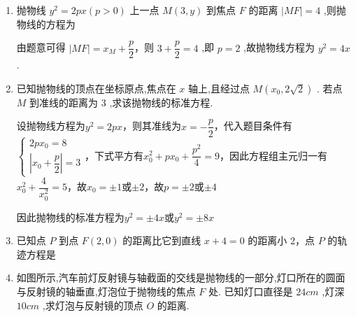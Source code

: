 \begin{enumerate}
\begin{enumerate}
\begin{jieda}
        \end{jieda}
        \item 抛物线 ${y}^{2} = {2px}\left( {p > 0}\right)$ 上一点 $M\left( {3,y}\right)$ 到焦点 $F$ 的距离 $\left| {MF}\right|  = 4$ ,则抛物线的方程为
        \begin{jieda}
            由题意可得 $\left| {MF}\right|  = {x}_{M} + \dfrac{p}{2}$，则 $3 + \dfrac{p}{2} = 4$ ,即 $p = 2$ ,故抛物线方程为 ${y}^{2} = {4x}$ .
        \end{jieda}
        \item 已知抛物线的顶点在坐标原点,焦点在 $x$ 轴上,且经过点 $M\left( {{x}_{0},2\sqrt{2}}\right)$ . 若点 $M$ 到准线的距离为 3 ,求该抛物线的标准方程.
        \begin{jieda}
            设抛物线方程为$y^2 = 2px$，则其准线为$x = -\dfrac{p}{2}$，代入题目条件有$\left\{\begin{array}{l}
                 2px_0 = 8 \\
                 \left|x_0 + \dfrac{p}{2}\right| = 3
            \end{array}\right.$，下式平方有$x_0^2 + px_0 + \dfrac{p^2}{4} = 9$，因此方程组主元归一有$x_0^2 + \dfrac{4}{x_0^2} = 5$，故$x_0 = \pm 1$或$\pm 2$，故$p = \pm 2$或$\pm 4$

            因此抛物线的标准方程为$y^2 = \pm 4x$或$y^2 = \pm 8x$
        \end{jieda}
        \item 已知点 $P$ 到点 $F\left( {2,0}\right)$ 的距离比它到直线 $x + 4 = 0$ 的距离小 2，点 $P$ 的轨迹方程是
        \item 如图所示,汽车前灯反射镜与轴截面的交线是抛物线的一部分,灯口所在的圆面与反射镜的轴垂直,灯泡位于抛物线的焦点 $F$ 处. 已知灯口直径是 $24cm$ ,灯深 $10cm$ ,求灯泡与反射镜的顶点 $O$ 的距离.
        

\end{enumerate}
\end{enumerate}
